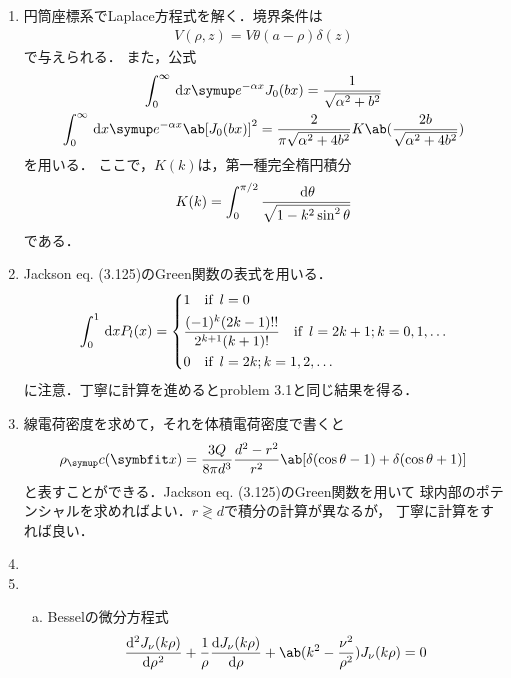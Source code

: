 \begin{enumerate}[%
  label=%
  \fbox{%
   {\thesection.\arabic*}%
    },%
    ]
  \item %
    円筒座標系でLaplace方程式を解く．境界条件は
    \begin{gather}
      V(\rho, z) = V \theta(a - \rho)\delta(z)
    \end{gather}
    で与えられる．
    また，公式
    \begin{gather}
      \int_0^\infty \dl{x} \e^{-\alpha x} J_0(bx)  = \frac{1}{\sqrt{\alpha^2 + b^2}}\\
      \int_0^\infty \dl{x} \e^{-\alpha x} \ab[J_0(bx)]^2 %
      = \frac{2}{\pi \sqrt{\alpha^2 + 4b^2}}K\ab(\frac{2b}{\sqrt{\alpha^2 + 4b^2}})
    \end{gather}
    を用いる．
    ここで，$K(k)$は，第一種完全楕円積分
    \begin{gather}
      K(k) = \int_0^{\pi/2} \frac{\dl{\theta}}{\sqrt{1-k^2\sin^2\theta}}
    \end{gather}
    である．
  \item %
    Jackson eq. (3.125)のGreen関数の表式を用いる．
    \begin{gather}
      \int_0^1 \dl{x}  P_l(x) = 
      \begin{dcases}
        1 \qqtext{if} l = 0\\
        \frac{(-1)^k(2k-1)!!}{2^{k+1}(k+1)!} \qqtext{if} l = 2k+1; k = 0, 1, \ldots\\
        0 \qqtext{if} l = 2k; k = 1, 2, \ldots
      \end{dcases}
    \end{gather}
    に注意．丁寧に計算を進めるとproblem 3.1と同じ結果を得る．
  \item %
    線電荷密度を求めて，それを体積電荷密度で書くと
    \begin{gather}
      \rho_\mr{c} (\bs{x}) = \frac{3Q}{8\pi d^3} \frac{d^2 - r^2}{r^2} %
      \ab[\delta(\cos\theta - 1) + \delta(\cos\theta + 1)]
    \end{gather}
    と表すことができる．Jackson eq. (3.125)のGreen関数を用いて
    球内部のポテンシャルを求めればよい．$r \gtrless d$で積分の計算が異なるが，
    丁寧に計算をすれば良い．
  \item %
  \item %
    \begin{enumerate}[(a)]
      \item
        Besselの微分方程式
        \begin{gather}
          \diff[2]{J_\nu(k\rho)}{\rho} + \frac{1}{\rho} \diff{J_\nu(k\rho)}{\rho} %
          + \ab(k^2 - \frac{\nu^2}{\rho^2})J_\nu(k\rho)  = 0

\end{gather}
\end{enumerate}
\end{enumerate}
